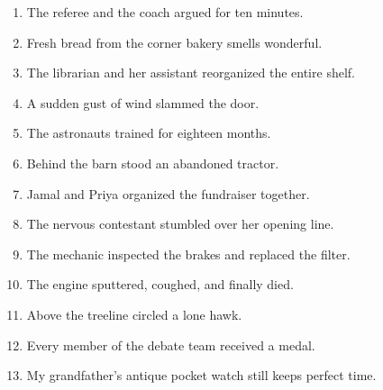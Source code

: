 \documentclass[11pt]{article}
\begin{document}
\begin{enumerate}
  \vspace{0.75in}
  \item The referee and the coach argued for ten minutes.
  \vspace{0.75in}
  \item Fresh bread from the corner bakery smells wonderful.
  \vspace{0.75in}
  \item The librarian and her assistant reorganized the entire shelf.
  \vspace{0.75in}
  \item A sudden gust of wind slammed the door.
  \vspace{0.75in}
  \item The astronauts trained for eighteen months.
  \vspace{0.75in}
  \item Behind the barn stood an abandoned tractor.
  \vspace{0.75in}
  \item Jamal and Priya organized the fundraiser together.
  \vspace{0.75in}
  \item The nervous contestant stumbled over her opening line.
  \vspace{0.75in}
  \item The mechanic inspected the brakes and replaced the filter.
  \vspace{0.75in}
  \item The engine sputtered, coughed, and finally died.
  \vspace{0.75in}
  \item Above the treeline circled a lone hawk.
  \vspace{0.75in}
  \item Every member of the debate team received a medal.
  \vspace{0.75in}
  \item My grandfather's antique pocket watch still keeps perfect time.
  \vspace{0.75in}
\end{enumerate}

\newpage
\end{document}
